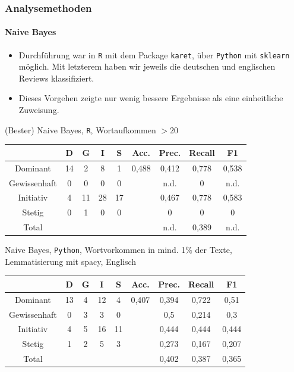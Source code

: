 \documentclass{beamer}
\begin{document}
\begin{frame}
\frametitle{Analysemethoden}
\framesubtitle{Naive Bayes}
\begin{itemize}\itemsep12pt
\item Durchführung war in \texttt{R} mit dem Package \texttt{karet}, über \texttt{Python} mit \texttt{sklearn} möglich. Mit letzterem haben wir jeweils die deutschen und englischen Reviews klassifiziert.
\item Dieses Vorgehen zeigte nur wenig bessere Ergebnisse als eine einheitliche Zuweisung.
\end{itemize}
\begin{center}
(Bester) Naive Bayes, \texttt{R}, Wortaufkommen $> 20$\
\begin{tabular}{|c|c|c|c|c|c|c|c|c|}
\hline
				& D 	& G	& I & S	& Acc.	& Prec. & Recall	& F1\\
\hline
Dominant 		& 14		& 2 			& 8 		& 1 		& 0,488 	& 0,412 	& 0,778 	& 0,538\\
Gewissenhaft 	& 0 		& 0 			& 0 		& 0 		& 			& n.d. 		& 0 	& n.d.\\
Initiativ 		& 4 		& 11			& 28		& 17		& 			& 0,467		& 0,778 	& 0,583\\
Stetig 			& 0 		& 1 			& 0 		& 0 		& 			& 0	   		& 0 	& 0\\
\hline
Total 			& 			& 				& 			& 			& 			& n.d. 		& 0,389  	& n.d.\\
\hline
\end{tabular}
\end{center}
\end{frame}

\begin{frame}
\begin{center}
Naive Bayes, \texttt{Python}, Wortvorkommen in mind. 1\% der Texte,\\
Lemmatisierung mit spacy, Englisch\
\begin{tabular}{|c|c|c|c|c|c|c|c|c|}
\hline
 & D 	& G	& I & S	& Acc.	& Prec. & Recall	& F1\\
\hline
Dominant & 13 & 4 & 12 & 4 & 0,407 & 0,394 & 0,722 & 0,51\\
Gewissenhaft & 0 & 3 & 3 & 0 & & 0,5 & 0,214 & 0,3\\
Initiativ & 4 & 5 & 16 & 11 & & 0,444 & 0,444 & 0,444\\
Stetig & 1 & 2 & 5 & 3 & & 0,273 & 0,167 & 0,207\\
\hline
Total  &   &   &   &   & & 0,402  & 0,387   & 0,365\\
\hline
\end{tabular}
\end{center}
\end{frame}
\end{document}
